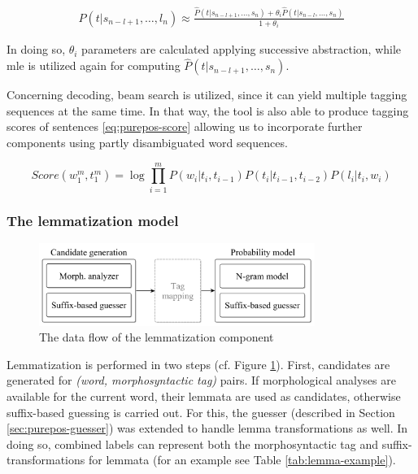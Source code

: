 \begin{align}
 P(t|s_{n-l+1}, \dots, l_n) 
 \approx \frac{ \hat{P}(t|s_{n-l+1}, \dots, s_n) + \theta_i \hat{P}(t|s_{n-l}, \dots, s_n)}{1+\theta_i}
\end{align}

In doing so, $\theta_i$ parameters are calculated applying successive abstraction, while \gls{mle} is utilized  again for computing $\hat{P}(t|s_{n-l+1}, \dots, s_n)$. 

Concerning decoding, beam search is utilized, since it can yield multiple tagging sequences at the same time. 
In that way, the tool is also able to produce tagging scores of sentences \eqref{eq:purepos-score} allowing us to incorporate further components using partly disambiguated word sequences. 

\begin{equation}\label{eq:purepos-score} %
Score(w_1^m,t_1^m) = \log \prod_{i=1}^m P(w_i|t_i,t_{i-1})P(t_i|t_{i-1},t_{i-2})P(l_i|t_i,w_i)
\end{equation}

\subsubsection{The lemmatization model}

\begin{figure}[H]
  \centering
  \includegraphics[width=0.8\textwidth]{MorphTagging/lemma_arch.png} 
  \caption{The data flow of the lemmatization component}
  \label{fig:lemma-arch}
\end{figure}

Lemmatization is performed in two steps (cf. Figure \ref{fig:lemma-arch}). 
First, candidates are generated for \emph{(word, morphosyntactic tag)} pairs. 
If morphological analyses are available for the current word, their lemmata are used as candidates, otherwise suffix-based guessing is carried out. 
For this, the guesser (described in Section \ref{sec:purepos-guesser}) was extended to handle lemma transformations as well. 
In doing so, combined labels can represent both the morphosyntactic tag and suffix-transformations for lemmata (for an example see Table \ref{tab:lemma-example}).



